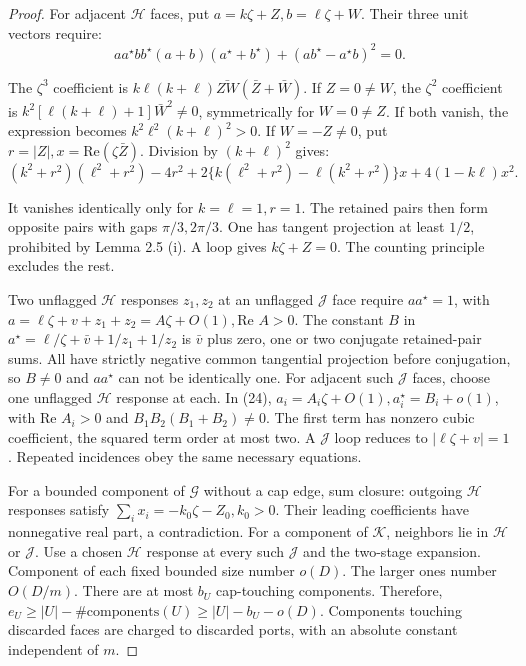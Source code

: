 \documentclass[10pt,reqno]{amsart}
\begin{document}
\begin{proof}
    For adjacent $\mathcal{H}$ faces, put $a = k \zeta + Z, b = \ell \zeta + W$. Their three unit vectors require:
    \begin{equation}
        aa^\star bb^\star (a + b) (a^\star + b^\star) + (ab^\star - a^\star b)^2 = 0.
    \end{equation}

    The $\zeta^3$ coefficient is $k \ell (k + \ell) \bar{ZW} (\bar{Z} + \bar{W})$. If $Z = 0 \ne W$, the $\zeta^2$ coefficient is $k^2 [\ell (k + \ell) + 1]\bar{W}^2 \ne 0$, symmetrically for $W = 0 \ne Z$. If both vanish, the expression becomes $k^2 \ell^2 (k + \ell)^2 > 0$. If $W = -Z \ne 0$, put $r = |Z|, x = \text{Re}(\zeta \bar{Z})$. Division by $(k + \ell)^2$ gives:
    \begin{equation}
        (k^2 + r^2) (\ell^2 + r^2) - 4r^2 + 2 \{k (\ell^2 + r^2) - \ell (k^2 + r^2)\} x + 4 (1 - k \ell) x^2.
    \end{equation}


    It vanishes identically only for $k = \ell = 1, r = 1$. The retained pairs then form opposite pairs with gaps $\pi / 3, 2 \pi /3$. One has tangent projection at least $1 / 2$, prohibited by Lemma 2.5 (i). A loop gives $k \zeta + Z = 0$. The counting principle excludes the rest.

    Two unflagged $\mathcal{H}$ responses $z_1, z_2$ at an unflagged $\mathcal{J}$ face require $a a^\star = 1$, with $a = \ell \zeta + v + z_1 + z_2 = A \zeta + O(1), \text{Re }A > 0$. The constant $B$ in $a^\star = \ell / \zeta + \bar{v} + 1 / z_1 + 1 / z_2$ is $\bar{v}$ plus zero, one or two conjugate retained-pair sums. All have strictly negative common tangential projection before conjugation, so $B \ne 0$ and $a a^\star$ can not be identically one. For adjacent such $\mathcal{J}$ faces, choose one unflagged $\mathcal{H}$ response at each. In (24), $a_i = A_i \zeta + O(1), a_i^\star = B_i + o(1)$, with $\text{Re } A_i > 0$ and $B_1 B_2 (B_1 + B_2) \ne 0$. The first term has nonzero cubic coefficient, the squared term order at most two. A $\mathcal{J}$ loop reduces to $| \ell \zeta + v| = 1$. Repeated incidences obey the same necessary equations.

    For a bounded component of $\mathcal{G}$ without a cap edge, sum closure: outgoing $\mathcal{H}$ responses satisfy $\sum_i x_i = - k_0 \zeta - Z_0, k_0 > 0$. Their leading coefficients have nonnegative real part, a contradiction. For a component of $\mathcal{K}$, neighbors lie in $\mathcal{H}$ or $\mathcal{J}$. Use a chosen $\mathcal{H}$ response at every such $\mathcal{J}$ and the two-stage expansion. Component of each fixed bounded size number $o(D)$. The larger ones number $O(D / m)$. There are at most $b_U$ cap-touching components. Therefore, $e_U \ge |U| - \# \text{components}(U) \ge |U| - b_U - o(D)$. Components touching discarded faces are charged to discarded ports, with an absolute constant independent of $m$.


\end{proof}
\end{document}
